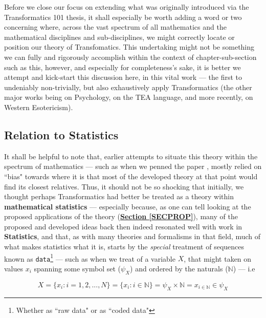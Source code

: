 \documentclass[a4paper, 18pt]{book} %
\begin{document}
\begin{appendices}
Before we close our focus on extending what was originally introduced via the Transformatics 101 thesis\cite{Lutalo2025_transformatics_thesis}, it shall especially be worth adding a word or two concerning where, across the vast spectrum of all mathematics and the mathematical disciplines and sub-disciplines, we might correctly locate or position our theory of Transfomatics. This undertaking might not be something we can fully and rigorously accomplish within the context of chapter-sub-section such as this, however, and especially for completeness's sake, it is better we attempt and kick-start this discussion here, in this vital work --- the first to undeniably non-trivially, but also exhaustively apply Transformatics (the other major works being \cite{Lutalo2025transpsy} on Psychology, \cite{Lutalo2024TEATAZ} on the TEA language, and more recently, \cite{lutalo_2025_grimlumtauto} on Western Esotericism).


\vspace{2em}

\subsection{Relation to Statistics}
\label{SECRELSTAT}

It shall be helpful to note that, earlier attempts to situate this theory within the spectrum of mathematics --- such as when we penned the paper \cite{transformatics}, mostly relied on ``bias" towards where it is that most of the developed theory at that point would find its closest relatives. Thus, it should not be so shocking that initially, we thought perhaps Transformatics had better be treated as a theory within \textbf{mathematical statistics} --- especially because, as one can tell looking at the proposed applications of the theory (\textbf{\hyperref[SECPROP]{Section \ref{SECPROP}}}), many of the proposed and developed ideas back then indeed resonated well with work in \textbf{Statistics}, and that, as with many theories and formalisms in that field, much of what makes statistics what it is, starts by the \textit{special} treatment of sequences known as \texttt{data}\footnote{Whether as ``raw data" or as ``coded data"\cite{clarke1992basic}} --- such as when we treat of a variable $X$, that might taken on values $x_i$ spanning some symbol set ($\psi_X$) and ordered by the naturals ($\mathbb{N}$) --- i.e 

\begin{equation}
X = \{ x_i: i = 1, 2, ..., N\} = \{x_i : i \in \mathbb{N}\} = \psi_X \times \mathbb{N} = x_{i\in \mathbb{N}} \in \psi_X
\end{equation}


\end{appendices}
\end{document}
